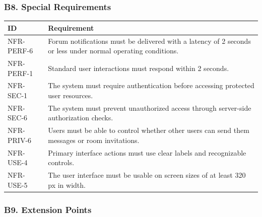 \documentclass[12pt]{article}
\renewcommand{\baselinestretch}{1.5}
\begin{document}
\subsubsection*{B8. Special Requirements}
\par\medskip

\begingroup
\small
\renewcommand{\baselinestretch}{1.0}\selectfont
\renewcommand{\arraystretch}{1.15}
\setlength{\tabcolsep}{6pt}
\begin{longtable}{|>{\raggedright\arraybackslash}p{}|>{\raggedright\arraybackslash}p{}|}
\hline
\textbf{ID} & \textbf{Requirement} \\ \hline
\endhead
NFR-PERF-6 & Forum notifications must be delivered with a latency of 2 seconds or less under normal operating conditions. \\ \hline
NFR-PERF-1 & Standard user interactions must respond within 2 seconds. \\ \hline
NFR-SEC-1 & The system must require authentication before accessing protected user resources. \\ \hline
NFR-SEC-6 & The system must prevent unauthorized access through server-side authorization checks. \\ \hline
NFR-PRIV-6 & Users must be able to control whether other users can send them messages or room invitations. \\ \hline
NFR-USE-4 & Primary interface actions must use clear labels and recognizable controls. \\ \hline
NFR-USE-5 & The user interface must be usable on screen sizes of at least 320 px in width. \\ \hline
\end{longtable}
\endgroup
\par\medskip

\hypertarget{sec:b9-extension-points}{}
\subsubsection*{B9. Extension Points}
\par\medskip
\end{document}

